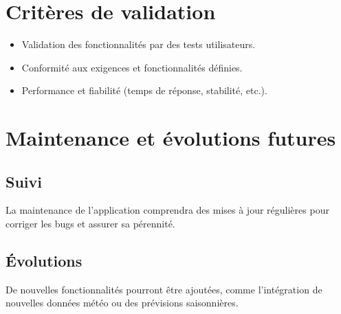 \documentclass[a4paper,12pt]{article}
\begin{document}
\section{Critères de validation}
\begin{itemize}
    \item Validation des fonctionnalités par des tests utilisateurs.
    \item Conformité aux exigences et fonctionnalités définies.
    \item Performance et fiabilité (temps de réponse, stabilité, etc.).
\end{itemize}

\section{Maintenance et évolutions futures}
\subsection{Suivi}
La maintenance de l'application comprendra des mises à jour régulières pour corriger les bugs et assurer sa pérennité.

\subsection{Évolutions}
De nouvelles fonctionnalités pourront être ajoutées, comme l'intégration de nouvelles données météo ou des prévisions saisonnières.
\end{document}
